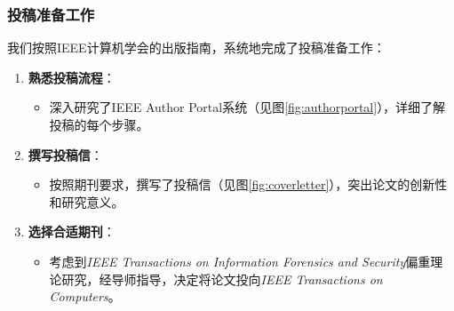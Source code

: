 \documentclass{beamer}
\begin{document}
\begin{frame}
    \frametitle{投稿准备工作}
    我们按照IEEE计算机学会的出版指南，系统地完成了投稿准备工作：
    \begin{enumerate}
        \item \textbf{熟悉投稿流程}：
        \begin{itemize}
            \item 深入研究了IEEE Author Portal系统（见图\ref{fig:authorportal}），详细了解投稿的每个步骤。
        \end{itemize}
        \item \textbf{撰写投稿信}：
        \begin{itemize}
            \item 按照期刊要求，撰写了投稿信（见图\ref{fig:coverletter}），突出论文的创新性和研究意义。
        \end{itemize}
        \item \textbf{选择合适期刊}：
        \begin{itemize}
            \item 考虑到\textit{IEEE Transactions on Information Forensics and Security}偏重理论研究，经导师指导，决定将论文投向\textit{IEEE Transactions on Computers}。
        \end{itemize}
    \end{enumerate}
\end{frame}
\end{document}
